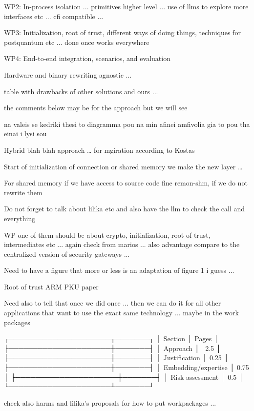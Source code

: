 \documentclass[a4paper,10pt,fleqn]{application}
\newcommand{\av}[1]{{\color{green!50!black}#1}}
\begin{document}
WP2: In-process isolation ... primitives higher level ... use of llms to explore more interfaces etc ... cfi compatible ...

WP3: Initialization, root of trust, different ways of doing things, techniques for postquantum etc ... done once works everywhere

WP4: End-to-end integration, scenarios, and evaluation

\av{Hardware and binary rewriting agnostic ...}

\av{table with drawbacks of other solutions and ours ...}

\av{the comments below may be for the approach but we will see}

\av{na valeis se kedriki thesi to diagramma pou na min afinei amfivolia gia to pou tha einai i lysi sou}

\av{Hybrid blah blah approach … for mgiration according to Kostas}

\av{Start of initialization of connection or shared memory we make the new layer …}

\av{For shared memory if we have access to source code fine remon-shm, if we do not rewrite them}

\av{Do not forget to talk about lilika etc and also have the llm to check the call and everything}

\av{WP one of them should be about crypto, initialization, root of trust, intermediates etc ... again check from marios ... also advantage compare to the centralized version of security gateways ...}

\av{Need to have a figure that more or less is an adaptation of figure 1 i guess ...}

\av{Root of trust ARM PKU paper}

\av{Need also to tell that once we did once ... then we can do it for all other applications that want to use the exact same technology ... maybe in the work packages}

┌─────────────────────┬───────┐
│       Section       │ Pages │
├─────────────────────┼───────┤
│ Approach            │ ~2.5  │
├─────────────────────┼───────┤
│ Justification       │ 0.25  │
├─────────────────────┼───────┤
│ Embedding/expertise │ 0.75  │
├─────────────────────┼───────┤
│ Risk assessment     │ 0.5   │
└─────────────────────┴───────┘

\av{check also harms and lilika's proposals for how to put workpackages ...}
\end{document}
